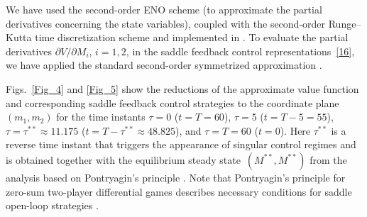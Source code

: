 \documentclass[11pt]{amsart}
\begin{document}
We have used the second-order ENO scheme (to approximate the partial
derivatives concerning the state variables), coupled with the 
second-order Runge--Kutta time discretization scheme %
and implemented in \cite{ROCHJ2019}.
To evaluate the partial derivatives $ \partial V / \partial M_i $, $ i = 1,2 $,
in the saddle feedback control representations~\cref{16}, we have applied the
standard second-order symmetrized approximation
\cite[\S 5.7]{PressTeukolskyVetterlingFlannery2007}.

Figs.~\ref{Fig_4} and \ref{Fig_5} show the reductions of the approximate
value function and corresponding saddle feedback control strategies to the
coordinate plane $ (m_1, m_2) $ for the time instants 
$ \tau = 0 $ ($ t = T = 60 $), $ \tau = 5 $ ($ t = T - 5 = 55 $),
$ \tau = \tau^{**} %
\approx 11.175 $ ($ t = T - \tau^{**} \approx 48.825 $),
and $ \tau = T = 60 $ ($ t = 0 $). Here $ \tau^{**} $ is a 
reverse time instant %
that triggers the appearance of singular control regimes and is obtained
together with the equilibrium steady state~$ \left( M^{**}, M^{**} \right) $
from the analysis based on 
Pontryagin's principle %
\cite{YegorovGrognardMailleretHalkettBernhard2019}. Note that Pontryagin's
principle for zero-sum two-player differential games describes necessary
conditions for saddle open-loop strategies \cite{Yong2015}.
\end{document}
